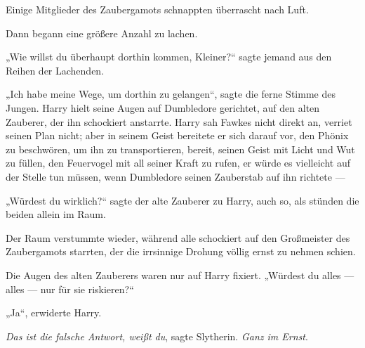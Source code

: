 Einige Mitglieder des Zaubergamots schnappten überrascht nach Luft.

Dann begann eine größere Anzahl zu lachen.

„Wie willst du überhaupt dorthin kommen, Kleiner?“ sagte jemand aus den Reihen der Lachenden.

„Ich habe meine Wege, um dorthin zu gelangen“, sagte die ferne Stimme des Jungen. Harry hielt seine Augen auf Dumbledore gerichtet, auf den alten Zauberer, der ihn schockiert anstarrte. Harry sah Fawkes nicht direkt an, verriet seinen Plan nicht; aber in seinem Geist bereitete er sich darauf vor, den Phönix zu beschwören, um ihn zu transportieren, bereit, seinen Geist mit Licht und Wut zu füllen, den Feuervogel mit all seiner Kraft zu rufen, er würde es vielleicht auf der Stelle tun müssen, wenn Dumbledore seinen Zauberstab auf ihn richtete —

„Würdest du wirklich?“ sagte der alte Zauberer zu Harry, auch so, als stünden die beiden allein im Raum.

Der Raum verstummte wieder, während alle schockiert auf den Großmeister des Zaubergamots starrten, der die irrsinnige Drohung völlig ernst zu nehmen schien.

Die Augen des alten Zauberers waren nur auf Harry fixiert.
„Würdest du alles — alles — nur für sie riskieren?“

„Ja“, erwiderte Harry.

\emph{Das ist die falsche Antwort, weißt du}, sagte Slytherin. \emph{Ganz im Ernst}.

